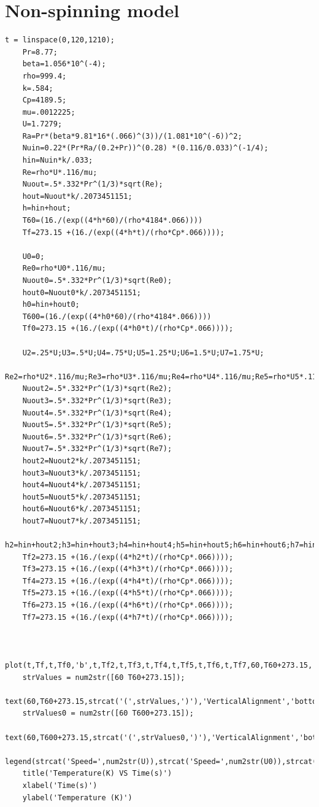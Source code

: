 \documentclass{report}
\begin{document}
	\section{Non-spinning model}\label{codeS}
	
	\begin{lstlisting}[style=Matlab-editor]
	t = linspace(0,120,1210);
	Pr=8.77;
	beta=1.056*10^(-4);
	rho=999.4;
	k=.584;
	Cp=4189.5;
	mu=.0012225;
	U=1.7279;
	Ra=Pr*(beta*9.81*16*(.066)^(3))/(1.081*10^(-6))^2;
	Nuin=0.22*(Pr*Ra/(0.2+Pr))^(0.28) *(0.116/0.033)^(-1/4);
	hin=Nuin*k/.033;
	Re=rho*U*.116/mu;
	Nuout=.5*.332*Pr^(1/3)*sqrt(Re);
	hout=Nuout*k/.2073451151;
	h=hin+hout;
	T60=(16./(exp((4*h*60)/(rho*4184*.066))))
	Tf=273.15 +(16./(exp((4*h*t)/(rho*Cp*.066))));
	
	U0=0;
	Re0=rho*U0*.116/mu;
	Nuout0=.5*.332*Pr^(1/3)*sqrt(Re0);
	hout0=Nuout0*k/.2073451151;
	h0=hin+hout0;
	T600=(16./(exp((4*h0*60)/(rho*4184*.066))))
	Tf0=273.15 +(16./(exp((4*h0*t)/(rho*Cp*.066))));
	
	U2=.25*U;U3=.5*U;U4=.75*U;U5=1.25*U;U6=1.5*U;U7=1.75*U;
	Re2=rho*U2*.116/mu;Re3=rho*U3*.116/mu;Re4=rho*U4*.116/mu;Re5=rho*U5*.116/mu;Re6=rho*U6*.116/mu;Re7=rho*U7*.116/mu;
	Nuout2=.5*.332*Pr^(1/3)*sqrt(Re2);
	Nuout3=.5*.332*Pr^(1/3)*sqrt(Re3);
	Nuout4=.5*.332*Pr^(1/3)*sqrt(Re4);
	Nuout5=.5*.332*Pr^(1/3)*sqrt(Re5);
	Nuout6=.5*.332*Pr^(1/3)*sqrt(Re6);
	Nuout7=.5*.332*Pr^(1/3)*sqrt(Re7);
	hout2=Nuout2*k/.2073451151;
	hout3=Nuout3*k/.2073451151;
	hout4=Nuout4*k/.2073451151;
	hout5=Nuout5*k/.2073451151;
	hout6=Nuout6*k/.2073451151;
	hout7=Nuout7*k/.2073451151;
	h2=hin+hout2;h3=hin+hout3;h4=hin+hout4;h5=hin+hout5;h6=hin+hout6;h7=hin+hout7;
	Tf2=273.15 +(16./(exp((4*h2*t)/(rho*Cp*.066))));
	Tf3=273.15 +(16./(exp((4*h3*t)/(rho*Cp*.066))));
	Tf4=273.15 +(16./(exp((4*h4*t)/(rho*Cp*.066))));
	Tf5=273.15 +(16./(exp((4*h5*t)/(rho*Cp*.066))));
	Tf6=273.15 +(16./(exp((4*h6*t)/(rho*Cp*.066))));
	Tf7=273.15 +(16./(exp((4*h7*t)/(rho*Cp*.066))));
	
	
	plot(t,Tf,t,Tf0,'b',t,Tf2,t,Tf3,t,Tf4,t,Tf5,t,Tf6,t,Tf7,60,T60+273.15,'b*',60,T600+273.15,'b*')
	strValues = num2str([60 T60+273.15]);
	text(60,T60+273.15,strcat('(',strValues,')'),'VerticalAlignment','bottom');
	strValues0 = num2str([60 T600+273.15]);
	text(60,T600+273.15,strcat('(',strValues0,')'),'VerticalAlignment','bottom');
	legend(strcat('Speed=',num2str(U)),strcat('Speed=',num2str(U0)),strcat('Speed=',num2str(U2)),strcat('Speed=',num2str(U3)),strcat('Speed=',num2str(U4)),strcat('Speed=',num2str(U5)),strcat('Speed=',num2str(U6)),strcat('Speed=',num2str(U7)));
	title('Temperature(K) VS Time(s)')
	xlabel('Time(s)')
	ylabel('Temperature (K)')
	\end{lstlisting}
	
	
	{}
	
	
\end{document}
